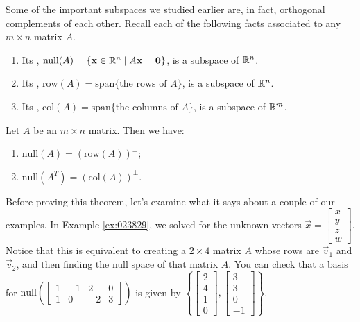 \documentclass{ximera}
\begin{document}
%

Some of the important subspaces we studied earlier are, in fact, orthogonal complements of each other.  Recall each of the following facts associated to any $m \times n$ matrix $A$.
\begin{enumerate}
    \item Its , $\mbox{null}(A) = \{\mathbf{x}\in \mathbb{R}^n \mid A\mathbf{x} = \mathbf{0}\}$, is a subspace of $\mathbb{R}^n$.
    \item Its , $\mbox{row}(A) = \mbox{span} \{ \mbox{the rows of } A\}$, is a subspace of $\mathbb{R}^n$.
    \item Its , $\mbox{col}(A) = \mbox{span} \{ \mbox{the columns of } A\}$, is a subspace of $\mathbb{R}^m$.
\end{enumerate}

\begin{theorem}\label{th:4subspaces}
Let $A$ be an $m \times n$ matrix.  Then we have:
\begin{enumerate}
\item\label{th:4subspacesa} $\mbox{null}(A) = (\mbox{row}(A))^\perp$;
\item\label{th:4subspacesb} $\mbox{null}(A^T) = (\mbox{col}(A))^\perp$.
\end{enumerate}
\end{theorem}

Before proving this theorem, let's examine what it says about a couple of our examples.  In Example \ref{ex:023829}, we solved for the unknown vectors $\vec{x} = \begin{bmatrix}
  x \\ y \\ z \\ w
  \end{bmatrix}$. Notice that this is equivalent to creating a $2 \times 4$ matrix $A$ whose rows are $\vec{v}_1$ and $\vec{v}_2$, and then finding the null space of that matrix $A$.  You can check that a basis for $\mbox{null}\left(\begin{bmatrix}
  1 & -1 & 2 & 0 \\
  1 & 0 & -2 & 3
  \end{bmatrix}\right)$
is given by $\left\{\begin{bmatrix}
  2 \\ 4 \\ 1 \\ 0
  \end{bmatrix},
  \begin{bmatrix}
  3 \\ 3 \\ 0 \\ -1
  \end{bmatrix}\right\}$.
\end{document}
